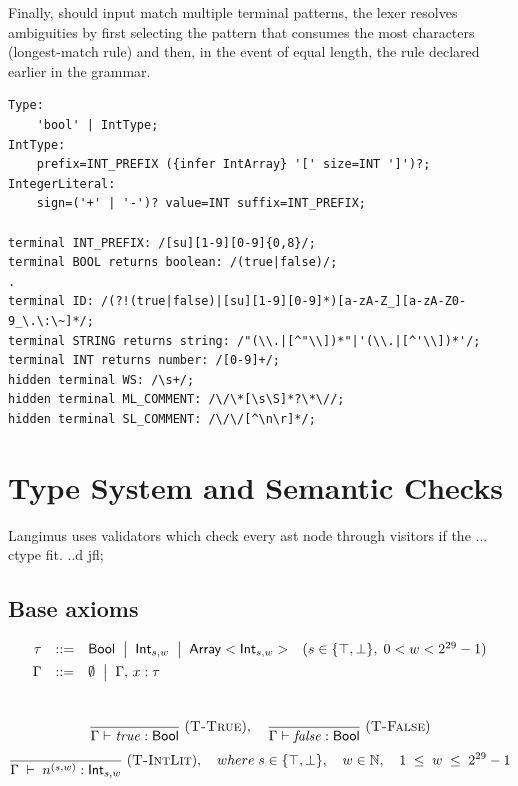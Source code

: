 Finally, should input match multiple terminal patterns, the lexer resolves ambiguities by first selecting the pattern that consumes the most characters (longest-match rule) and then, in the event of equal length, the rule declared earlier in the grammar.

\begin{verbatim}
Type:
    'bool' | IntType;
IntType:
    prefix=INT_PREFIX ({infer IntArray} '[' size=INT ']')?;
IntegerLiteral:
    sign=('+' | '-')? value=INT suffix=INT_PREFIX;

terminal INT_PREFIX: /[su][1-9][0-9]{0,8}/;
terminal BOOL returns boolean: /(true|false)/;
.
terminal ID: /(?!(true|false)|[su][1-9][0-9]*)[a-zA-Z_][a-zA-Z0-9_\.\:\~]*/;
terminal STRING returns string: /"(\\.|[^"\\])*"|'(\\.|[^'\\])*'/;
terminal INT returns number: /[0-9]+/;
hidden terminal WS: /\s+/;
hidden terminal ML_COMMENT: /\/\*[\s\S]*?\*\//;
hidden terminal SL_COMMENT: /\/\/[^\n\r]*/;
\end{verbatim}

\section{Type System and Semantic Checks}

Langimus uses validators which check every ast node through visitors if the ... ctype fit. ..d jfl;

\subsection*{Base axioms}
\[
\begin{array}{rcll}
  \tau & ::= & \mathsf{Bool} 
            \;\bigm|\; \mathsf{Int}_{s,w}
            \;\bigm|\; \mathsf{Array}<\mathsf{Int}_{s,w}>
  & (s\in\{\top,\bot\},\;0<w<2^{29}-1) \\[1ex]
  \Gamma & ::= & \emptyset 
               \;\bigm|\; \Gamma,\,x:\tau
\end{array}
\]
\\
\[
  \frac{}{\Gamma \vdash \mathit{true} : \mathsf{Bool}}
  \; (\textsc{T-True}), \quad
  \frac{}{\Gamma \vdash \mathit{false} : \mathsf{Bool}}
  \; (\textsc{T-False})
\]
\[
  \frac{}
  {\Gamma \;\vdash\; n^{(s,w)} : \mathsf{Int}_{s,w}}
  \; (\textsc{T-IntLit}), \quad
  where\;
  s \in \{\top, \bot\},
  \quad
  w \in \mathbb{N},
  \quad
  1 \;\le\; w \;\le\; 2^{29}-1
\]

